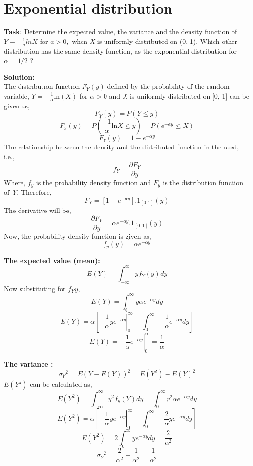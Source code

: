 

\section{Exponential distribution}
\noindent \textbf{Task:} Determine the expected value, the variance and the density function of  $Y = -\frac{1}{a}lnX$ for $a>0,$ when \textit{X} is uniformly distributed on (0, 1). Which other distribution has the same density function, as the exponential distribution for $\alpha = 1/2$ ?

\noindent \textbf{Solution:}\\
\noindent The distribution function $F_Y(y)$ defined by the probability of the random variable, $Y = - \frac{1}{\alpha}\text{ln}(X)$ for $\alpha > 0$ and \textit{X} is uniformly distributed on [0, 1] can be given as,
$$  F_Y(y) = P(Y \leq y)   $$
$$  F_Y(y) = P(\frac{-1}{\alpha}\text{ln}X \leq y) = P(e^{-\alpha y} \leq X)  $$
$$  F_Y(y) =  1 - e^{-\alpha y}$$
\noindent The relationship between the density and the distributed function in the used, i.e.,
$$ f_Y = \frac{\partial F_Y}{\partial y} $$
\noindent Where, $f_y$ is the probability density function and $F_y$ is the distribution function of \textit{Y}. Therefore,
$$ F_Y = [1 - e^{-\alpha y}] . 1_{[0,1]}(y) $$
\noindent The derivative will be,
$$ \frac{\partial F_Y}{\partial y} = \alpha e^{-\alpha y} . 1_{[0,1]}(y) $$
\noindent Now, the probability density function is given as,
$$ f_y(y) = \alpha e^{-\alpha y} $$

\noindent \textbf{The expected value (mean):}\\
$$E(Y) = \int_{-\infty}^{\infty} y f_Y(y) dy $$
\noindent Now substituting for $f_Y{y},$
$$E(Y) = \int_{0}^{\infty} y \alpha e^{-\alpha y}dy$$
$$E(Y) = \alpha\left[\left.-\frac{1}{\alpha}y e^{-\alpha y}\right|_{0}^{\infty}-\int_{0}^{\infty}-\frac{1}{\alpha}e^{-\alpha y}dy\right]$$
$$E(Y)=\left.-\frac{1}{\alpha}e^{-\alpha y}\right|_{0}^{\infty}=\frac{1}{\alpha}$$

\noindent \textbf{The variance :}\\
$${\sigma_Y}^{2} = E(Y-E(Y))^2=E(Y^2)-E(Y)^2$$
\noindent $ E(Y^2) $ can be calculated as,
$$E(Y^2) = \int_{-\infty}^{\infty}y^2 f_y(Y) dy = \int_{0}^{\infty}y^2 \alpha e^{-\alpha y}dy $$
$$E(Y^2) = \alpha\left[\left.-\frac{1}{\alpha}y e^{-\alpha y}\right|_{0}^{\infty}-\int_{0}^{\infty}-\frac{2}{\alpha}ye^{-\alpha y} dy\right]$$
$$E(Y^2) = 2\int_{0}^{\infty}y e^{-\alpha y} dy = \frac{2}{\alpha^2}$$
$${\sigma_Y}^{2} = \frac{2}{\alpha^2}-\frac{1}{\alpha^2}=\frac{1}{\alpha^2}$$

